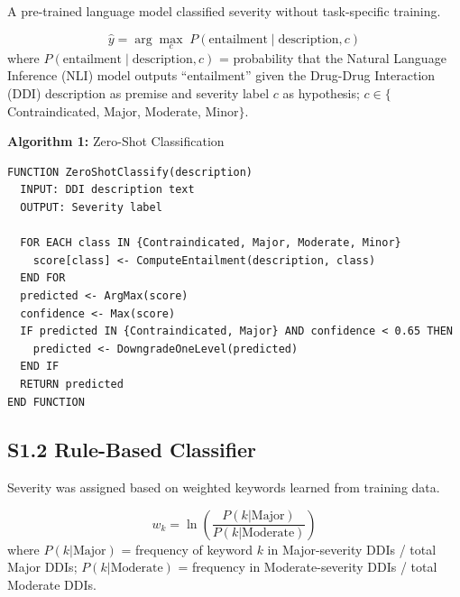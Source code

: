 \documentclass[12pt,a4paper]{article}
\begin{document}
A pre-trained language model classified severity without task-specific training.

\[
\hat{y} = \arg\max_{c} \; P(\text{entailment} \mid \text{description}, c)
\]
where $P(\text{entailment} \mid \text{description}, c)$ = probability that the Natural Language Inference (NLI) model outputs ``entailment'' given the Drug-Drug Interaction (DDI) description as premise and severity label $c$ as hypothesis; $c \in \{$Contraindicated, Major, Moderate, Minor$\}$.

\medskip
\noindent\textbf{Algorithm 1:} Zero-Shot Classification
\begin{verbatim}
FUNCTION ZeroShotClassify(description)
  INPUT: DDI description text
  OUTPUT: Severity label
  
  FOR EACH class IN {Contraindicated, Major, Moderate, Minor}
    score[class] <- ComputeEntailment(description, class)
  END FOR
  predicted <- ArgMax(score)
  confidence <- Max(score)
  IF predicted IN {Contraindicated, Major} AND confidence < 0.65 THEN
    predicted <- DowngradeOneLevel(predicted)
  END IF
  RETURN predicted
END FUNCTION
\end{verbatim}

\subsection{S1.2 Rule-Based Classifier}

Severity was assigned based on weighted keywords learned from training data.

\[
w_k = \ln\left(\frac{P(k|\text{Major})}{P(k|\text{Moderate})}\right)
\]
where $P(k|\text{Major})$ = frequency of keyword $k$ in Major-severity DDIs / total Major DDIs; $P(k|\text{Moderate})$ = frequency in Moderate-severity DDIs / total Moderate DDIs.
\end{document}
